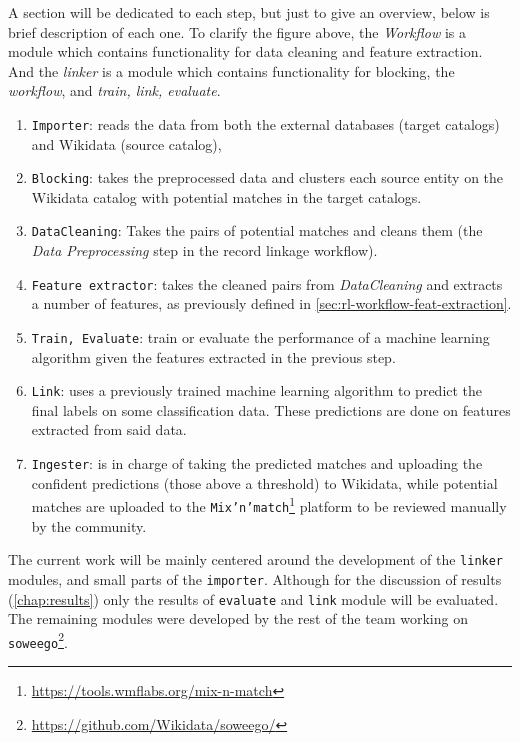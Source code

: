 \documentclass[epsfig,a4paper,11pt,titlepage,twoside,openany]{book}
\newcommand{\footurl}[1]{\footnote{\url{#1}}}
\begin{document}
A section will be dedicated to each step, but just to give an overview, below is brief description of each one. To clarify the figure above, the \textit{Workflow} is a module which contains functionality for data cleaning and feature extraction. And the \textit{linker} is a module which contains functionality for blocking, the \textit{workflow}, and \textit{train, link, evaluate}.

\begin{enumerate}
\item \texttt{Importer}: 
reads the data from both the external databases (target catalogs) and Wikidata (source catalog),

\item \texttt{Blocking}: 
takes the preprocessed data and clusters each source entity on the Wikidata catalog with potential matches in the target catalogs.

\item \texttt{DataCleaning}: 
Takes the pairs of potential matches and cleans them (the \textit{Data Preprocessing} step in the record linkage workflow).
  
\item \texttt{Feature extractor}: 
takes the cleaned pairs from \textit{DataCleaning} and extracts a number of features, as previously defined in \autoref{sec:rl-workflow-feat-extraction}.
 
\item \texttt{Train, Evaluate}:
train or evaluate the performance of a machine learning algorithm given the features extracted in the previous step.

\item \texttt{Link}:
uses a previously trained machine learning algorithm to predict the final labels on some classification data. These predictions are done on features extracted from said data.
 
\item \texttt{Ingester}: 
is in charge of taking the predicted matches and uploading the confident predictions (those above a threshold) to Wikidata, while potential matches are uploaded to the \texttt{Mix'n'match}\footurl{https://tools.wmflabs.org/mix-n-match} platform to be reviewed manually by the community.
\end{enumerate}

The current work will be mainly centered around the development of the \texttt{linker} modules, and small parts of the \texttt{importer}. Although for the discussion of results  (\autoref{chap:results}) only the results of  \texttt{evaluate} and \texttt{link} module will be evaluated.  The remaining modules were developed by the rest of the team working on \texttt{soweego}\footurl{https://github.com/Wikidata/soweego/}.
\end{document}
